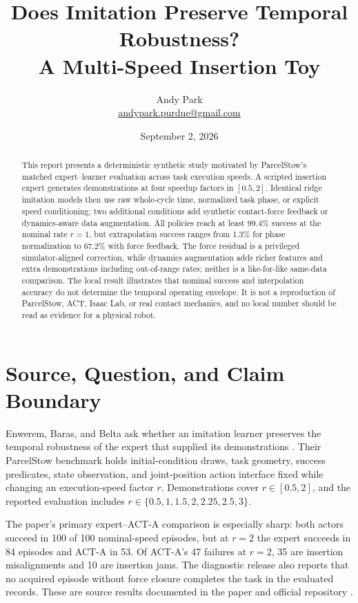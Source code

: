 \documentclass[11pt]{article}
\title{Does Imitation Preserve Temporal Robustness?\\A Multi-Speed Insertion Toy}
\author{Andy Park\\\href{mailto:andypark.purdue@gmail.com}{andypark.purdue@gmail.com}}
\date{September 2, 2026}
\begin{document}
\maketitle

\begin{abstract}
This report presents a deterministic synthetic study motivated by ParcelStow's matched expert--learner evaluation across task execution speeds. A scripted insertion expert generates demonstrations at four speedup factors in $[0.5,2]$. Identical ridge imitation models then use raw whole-cycle time, normalized task phase, or explicit speed conditioning; two additional conditions add synthetic contact-force feedback or dynamics-aware data augmentation. All policies reach at least 99.4\% success at the nominal rate $r=1$, but extrapolation success ranges from 1.3\% for phase normalization to 67.2\% with force feedback. The force residual is a privileged simulator-aligned correction, while dynamics augmentation adds richer features and extra demonstrations including out-of-range rates; neither is a like-for-like same-data comparison. The local result illustrates that nominal success and interpolation accuracy do not determine the temporal operating envelope. It is not a reproduction of ParcelStow, ACT, Isaac Lab, or real contact mechanics, and no local number should be read as evidence for a physical robot.
\end{abstract}

\section{Source, Question, and Claim Boundary}

Enwerem, Baras, and Belta ask whether an imitation learner preserves the temporal robustness of the expert that supplied its demonstrations \cite{parcelstowpaper}. Their ParcelStow benchmark holds initial-condition draws, task geometry, success predicates, state observation, and joint-position action interface fixed while changing an execution-speed factor $r$. Demonstrations cover $r\in[0.5,2]$, and the reported evaluation includes $r\in\{0.5,1,1.5,2,2.25,2.5,3\}$.

The paper's primary expert--ACT-A comparison is especially sharp: both actors succeed in 100 of 100 nominal-speed episodes, but at $r=2$ the expert succeeds in 84 episodes and ACT-A in 53. Of ACT-A's 47 failures at $r=2$, 35 are insertion misalignments and 10 are insertion jams. The diagnostic release also reports that no acquired episode without force closure completes the task in the evaluated records. These are source results documented in the paper and official repository \cite{parcelstowpaper,parcelstowrepo}.
\end{document}
